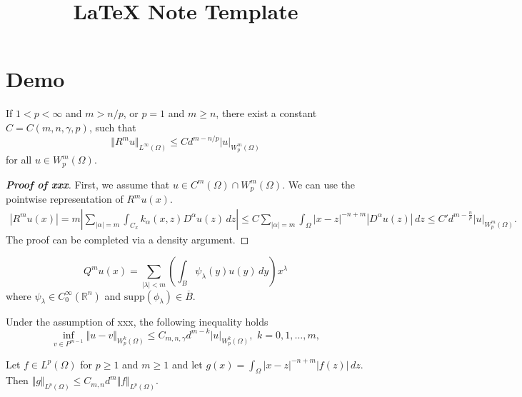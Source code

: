 \documentclass{article}
\title{\LaTeX{} Note Template}
\author{}
\date{}
\begin{document}
\section{Demo}

\begin{theorem}[xxx]
    If $1<p<\infty$ and $m > n/p$, or $p=1$ and $m \ge n$, there exist a constant $C = C(m,n,\gamma,p)$, such that
    \begin{equation*}
        \Vert R^m u \Vert_{L^\infty(\Omega)} \le C d^{m-n/p} |u|_{W^m_p(\Omega)}
    \end{equation*}
    for all $u \in W^m_p(\Omega)$.
\end{theorem}
\begin{proof}[\upshape\bfseries Proof of xxx]
    First, we assume that $u \in C^m(\Omega) \cap W^m_p(\Omega)$. We can use the pointwise representation of $R^mu(x)$.
    \begin{align*}
        |R^mu(x)| ={}  m \left| \sum_{|\alpha| = m} \int_{C_x} k_{\alpha}(x,z) D^\alpha u(z)\,dz \right|
        \le{}  C \sum_{|\alpha|=m} \int_{\Omega} |x-z|^{-n+m} |D^\alpha u(z)|\,dz
        \le{}       C' d^{m-\frac{n}{p}} |u|_{W^m_p(\Omega)}.
    \end{align*}
    The proof can be completed via a density argument.
\end{proof}

\begin{proposition}[xxx]
    \begin{equation*}
        Q^m u(x) = \sum_{|\lambda| < m} \left( \int_B \psi_\lambda(y) u(y)\,dy \right) x^\lambda
    \end{equation*}
    where $\psi_\lambda \in C_0^\infty(\mathbb{R}^n)$ and $\mathrm{supp}(\phi_\lambda) \in \overline{B}$.
\end{proposition}


\begin{corollary}[xxx]
    Under the assumption of xxx, the following inequality holds
    \begin{equation*}
        \inf_{v \in P^{m-1}} \Vert u - v \Vert_{W^k_p(\Omega)} \le C_{m,n,\gamma} d^{m-k} |u|_{W^k_p(\Omega)}, \,\, k = 0,1,\dots,m,
    \end{equation*}
\end{corollary}

\begin{lemma}[xxx]
    Let $f \in L^p(\Omega)$ for $p \ge 1$ and $m \ge 1$ and let $g(x) = \int_\Omega |x-z|^{-n+m} |f(z)|\,dz$.
    Then $\Vert g \Vert_{L^p(\Omega)} \le C_{m,n} d^m \Vert f\Vert_{L^p(\Omega)}$.
\end{lemma}
\end{document}
